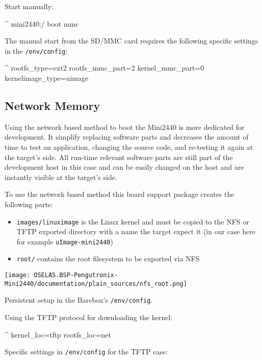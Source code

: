 Start manually:

\begin{ptxshell}[escapechar=|]{^}
mini2440:/ boot mmc
\end{ptxshell}

The manual start from the SD/MMC card requires the following specific settings
in the \texttt{/env/config}:

\begin{ptxshell}[escapechar=|]{^}
rootfs_type=ext2
rootfs_mmc_part=2
kernel_mmc_part=0
kernelimage_type=uimage
\end{ptxshell}

\subsection{Network Memory}				\label{sec:networkmem}

Using the network based method to boot the Mini2440 is more dedicated for
development. It simplify replacing software parts and decreases the amount
of time to test an application, changing the source code, and re-testing it
again at the target's side. All run-time relevant software parts are still
part of the development host in this case and can be easily changed on the
host and are instantly visible at the target's side.

To use the network based method this board support package creates the
following parts:

\begin{itemize}
\item \texttt{\ptxdistPlatformDir images/linuximage} is the Linux kernel
	and must be copied to the NFS or TFTP exported directory with a
	name the target expect it (in our case here for example
	\texttt{uImage-mini2440})
\item \texttt{\ptxdistPlatformDir root/} contains the root filesystem
	to be exported via NFS
\end{itemize}

\centerline{\texttt{[image: OSELAS.BSP-Pengutronix-Mini2440/documentation/plain\_sources/nfs\_root.png]}}

Persistent setup in the Barebox's \texttt{/env/config}.

Using the TFTP protocol for downloading the kernel:

\begin{ptxshell}[escapechar=|]{^}
kernel_loc=tftp
rootfs_loc=net
\end{ptxshell}

Specific settings in \texttt{/env/config} for the TFTP case:

